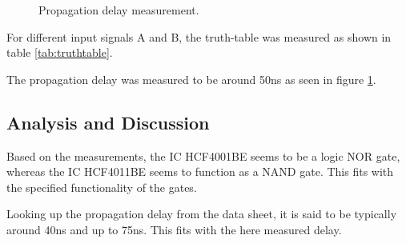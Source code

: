 \documentclass[journal]{IEEEtran}
\begin{document}
 \begin{figure}
   \centering
  \caption{Propagation delay measurement.}
  \label{fig:propdelay}
\end{figure}

For different input signals A and B, the truth-table was measured as
shown in table \ref{tab:truthtable}.

The propagation delay was measured to be around 50ns as seen in figure
\ref{fig:propdelay}.

\subsection{Analysis and Discussion}

Based on the measurements, the IC HCF4001BE seems to be a logic NOR gate,
whereas the IC HCF4011BE seems to function as a NAND gate. This fits with the
specified functionality of the gates.

Looking up the propagation delay from the data sheet, it is said to be typically
around 40ns and up to 75ns. This fits with the here measured delay.
\end{document}
